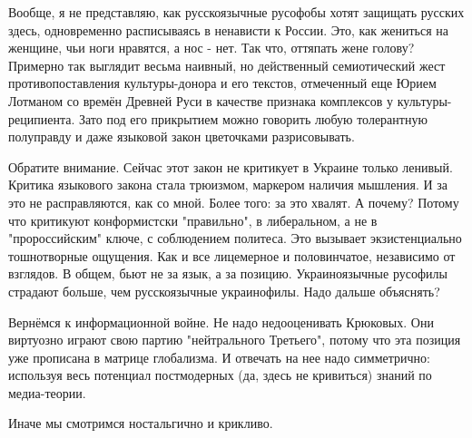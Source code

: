 Вообще, я не представляю, как русскоязычные русофобы хотят защищать русских
здесь, одновременно расписываясь в ненависти к России. Это, как жениться на
женщине, чьи ноги нравятся, а нос - нет. Так что, оттяпать жене голову?
Примерно так выглядит весьма наивный, но действенный семиотический жест
противопоставления культуры-донора и его текстов, отмеченный еще Юрием Лотманом
со времён Древней Руси в качестве признака комплексов у культуры-реципиента.
Зато под его прикрытием можно говорить любую толерантную полуправду и даже
языковой закон цветочками разрисовывать. 

Обратите внимание. Сейчас этот закон не критикует в Украине только ленивый.
Критика языкового закона стала трюизмом, маркером наличия мышления. И за это не
расправляются, как со мной. Более того: за это хвалят. А почему? Потому что
критикуют конформистски "правильно", в либеральном, а не в "пророссийским"
ключе, с соблюдением политеса. Это вызывает экзистенциально тошнотворные
ощущения. Как и все лицемерное и половинчатое, независимо от взглядов. В общем,
бьют не за язык, а за позицию. Украиноязычные русофилы страдают больше, чем
русскоязычные украинофилы. Надо дальше объяснять?

Вернёмся к информационной войне. Не надо недооценивать Крюковых. Они виртуозно
играют свою партию "нейтрального Третьего", потому что эта позиция уже
прописана в матрице глобализма. И отвечать на нее надо симметрично: используя
весь потенциал постмодерных (да, здесь не кривиться) знаний по медиа-теории.

Иначе мы смотримся ностальгично и крикливо.

